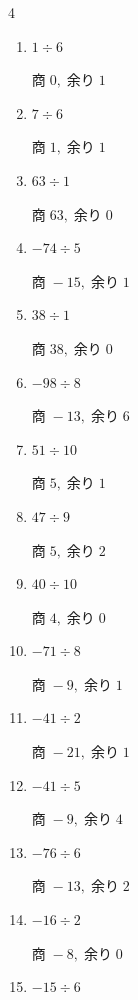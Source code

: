 \begin{multicols}{4}
\begin{enumerate}
  \item $1 \div 6$

        $商\; 0,\; 余り\; 1$

\columnbreak %

\resetques

  \item $7 \div 6$

        $商\; 1,\; 余り\; 1$

  \item $63 \div 1$

        $商\; 63,\; 余り\; 0$

  \item $-74 \div 5$

        $商\; -15,\; 余り\; 1$

  \item $38 \div 1$

        $商\; 38,\; 余り\; 0$

  \item $-98 \div 8$

        $商\; -13,\; 余り\; 6$

  \item $51 \div 10$

        $商\; 5,\; 余り\; 1$

  \item $47 \div 9$

        $商\; 5,\; 余り\; 2$

  \item $40 \div 10$

        $商\; 4,\; 余り\; 0$

  \item $-71 \div 8$

        $商\; -9,\; 余り\; 1$

  \item $-41 \div 2$

        $商\; -21,\; 余り\; 1$

  \item $-41 \div 5$

        $商\; -9,\; 余り\; 4$

  \item $-76 \div 6$

        $商\; -13,\; 余り\; 2$

  \item $-16 \div 2$

        $商\; -8,\; 余り\; 0$

  \item $-15 \div 6$


\end{enumerate}
\end{multicols}
